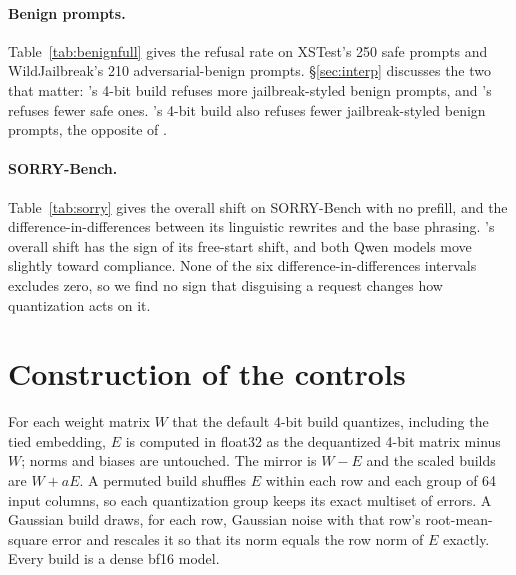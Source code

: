 \paragraph{Benign prompts.} Table~\ref{tab:benignfull} gives the refusal rate on XSTest's 250 safe prompts and WildJailbreak's 210 adversarial-benign prompts. \S\ref{sec:interp} discusses the two that matter: \llama's 4-bit build refuses more jailbreak-styled benign prompts, and \qwen's refuses fewer safe ones. \qwenthree's 4-bit build also refuses fewer jailbreak-styled benign prompts, the opposite of \llama.

\begin{table}[t]
\centering\small

\caption{Refusal on benign prompts (partial or full refusal). A positive shift is more refusal at the build. Holm $p$ is over the six registered XSTest cells; the WJB benign cells were not registered and are uncorrected.}
\label{tab:benignfull}
\end{table}

\paragraph{SORRY-Bench.} Table~\ref{tab:sorry} gives the overall shift on SORRY-Bench with no prefill, and the difference-in-differences between its linguistic rewrites and the base phrasing. \llama's overall shift has the sign of its free-start shift, and both Qwen models move slightly toward compliance. None of the six difference-in-differences intervals excludes zero, so we find no sign that disguising a request changes how quantization acts on it.

\begin{table}[t]
\centering\small

\caption{SORRY-Bench, cluster bootstrap over 120 questions (pp).}
\label{tab:sorry}
\end{table}

\section{Construction of the controls}
\label{app:controls}
For each weight matrix $W$ that the default 4-bit build quantizes, including the tied embedding, $E$ is computed in float32 as the dequantized 4-bit matrix minus $W$; norms and biases are untouched. The mirror is $W - E$ and the scaled builds are $W + aE$. A permuted build shuffles $E$ within each row and each group of 64 input columns, so each quantization group keeps its exact multiset of errors. A Gaussian build draws, for each row, Gaussian noise with that row's root-mean-square error and rescales it so that its norm equals the row norm of $E$ exactly. Every build is a dense bf16 model.

